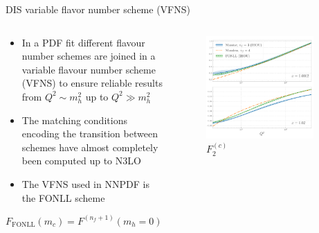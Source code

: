 \begin{frame}{DIS variable flavor number scheme (VFNS)}
  \begin{columns}
    \begin{column}{0.59\textwidth}
      \begin{itemize}
        \item In a PDF fit different flavour number schemes are joined in a variable flavour number scheme (VFNS) to ensure reliable results from $Q^2\sim m_h^2$ up to $Q^2\gg m_h^2$
        \item The matching conditions encoding the transition between schemes have almost completely been computed up to N3LO
        \item The VFNS used in NNPDF is the FONLL scheme
      \end{itemize}

      \vspace*{1em}
      \begin{equation*}
        F_\mathrm{FONLL}(m_c) =F^{(n_f+1)}(m_h=0)
        +F^{(n_f)}(m_c)-\lim_{m_c\rightarrow 0}F^{(n_f)}(m_h)
      \end{equation*}
    \end{column}
    \begin{column}{0.39\textwidth}
      \vspace*{-2em}
      \begin{figure}[!t]
        \centering
        \includegraphics[width=0.89\textwidth]{figures/F2_charm_n3lo.pdf}
        \caption*{$F_2^{(c)}$}
      \end{figure}
    \end{column}
  \end{columns}


\end{frame}

